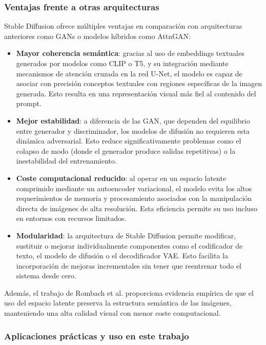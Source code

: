 \subsubsection{Ventajas frente a otras arquitecturas}

Stable Diffusion ofrece múltiples ventajas en comparación con arquitecturas anteriores como GANs o modelos híbridos como AttnGAN:

\begin{itemize}
    \item \textbf{Mayor coherencia semántica}: gracias al uso de embeddings textuales generados por modelos como CLIP o T5, y su integración mediante mecanismos de atención cruzada en la red U-Net, el modelo es capaz de asociar con precisión conceptos textuales con regiones específicas de la imagen generada. Esto resulta en una representación visual más fiel al contenido del prompt.

    \item \textbf{Mejor estabilidad}: a diferencia de las GAN, que dependen del equilibrio entre generador y discriminador, los modelos de difusión no requieren esta dinámica adversarial. Esto reduce significativamente problemas como el colapso de modo (donde el generador produce salidas repetitivas) o la inestabilidad del entrenamiento.

    \item \textbf{Coste computacional reducido}: al operar en un espacio latente comprimido mediante un autoencoder variacional, el modelo evita los altos requerimientos de memoria y procesamiento asociados con la manipulación directa de imágenes de alta resolución. Esta eficiencia permite su uso incluso en entornos con recursos limitados.

    \item \textbf{Modularidad}: la arquitectura de Stable Diffusion permite modificar, sustituir o mejorar individualmente componentes como el codificador de texto, el modelo de difusión o el decodificador VAE. Esto facilita la incorporación de mejoras incrementales sin tener que reentrenar todo el sistema desde cero.
\end{itemize}

Además, el trabajo de Rombach et al. \cite{rombach2022high} proporciona evidencia empírica de que el uso del espacio latente preserva la estructura semántica de las imágenes, manteniendo una alta calidad visual con menor coste computacional.

\subsubsection{Aplicaciones prácticas y uso en este trabajo}

